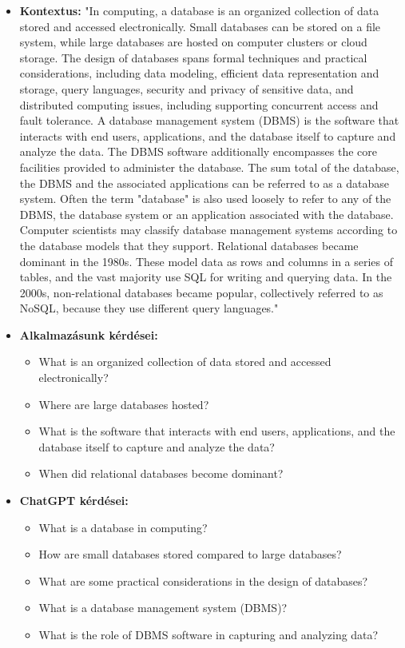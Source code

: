 \begin{itemize}
\hrule	
	
\item \textbf{Kontextus:} "In computing, a database is an organized collection of data stored and accessed electronically. Small databases can be stored on a file system, while large databases are hosted on computer clusters or cloud storage. The design of databases spans formal techniques and practical considerations, including data modeling, efficient data representation and storage, query languages, security and privacy of sensitive data, and distributed computing issues, including supporting concurrent access and fault tolerance. A database management system (DBMS) is the software that interacts with end users, applications, and the database itself to capture and analyze the data. The DBMS software additionally encompasses the core facilities provided to administer the database. The sum total of the database, the DBMS and the associated applications can be referred to as a database system. Often the term "database" is also used loosely to refer to any of the DBMS, the database system or an application associated with the database. Computer scientists may classify database management systems according to the database models that they support. Relational databases became dominant in the 1980s. These model data as rows and columns in a series of tables, and the vast majority use SQL for writing and querying data. In the 2000s, non-relational databases became popular, collectively referred to as NoSQL, because they use different query languages."
\item \textbf{Alkalmazásunk kérdései:} 
	\begin{itemize}
		\item What is an organized collection of data stored and accessed electronically?
		\item Where are large databases hosted?
		\item What is the software that interacts with end users, applications, and the database itself to capture and analyze the data?
		\item When did relational databases become dominant?
	\end{itemize}
\item \textbf{ChatGPT kérdései:} 
	\begin{itemize}
		\item What is a database in computing?
		\item How are small databases stored compared to large databases?
		\item What are some practical considerations in the design of databases?
		\item What is a database management system (DBMS)?
		\item What is the role of DBMS software in capturing and analyzing data?
	\end{itemize}
\end{itemize}